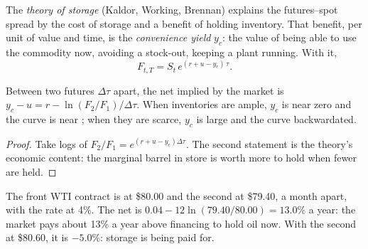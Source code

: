 \begin{definition}\label{def:m3:forward-curves-storage-and-convenience-yield:storage}
The \emph{theory of storage} (Kaldor, Working, Brennan) explains the
futures--spot spread by the cost of storage and a benefit of holding inventory. That benefit, per
unit of value and time, is the \emph{convenience yield} $y_c$: the value of
being able to use the commodity now, avoiding a stock-out, keeping a plant running. With it,
\[
F_{t,T} = S_t\,e^{(r + u - y_c)\,\tau}.
\]
\end{definition}

\begin{proposition}\label{prop:m3:forward-curves-storage-and-convenience-yield:inventory}
Between two futures $\Delta\tau$ apart, the net  implied by the market is
$y_c - u = r - \ln(F_2/F_1)/\Delta\tau$. When inventories are ample, $y_c$ is near zero and the curve
is near ; when they are scarce, $y_c$ is large and the curve backwardated.
\end{proposition}

\begin{proof}
Take logs of $F_2/F_1 = e^{(r + u - y_c)\Delta\tau}$. The second statement is the theory's economic
content: the marginal barrel in store is worth more to hold when fewer are held.
\end{proof}

\begin{example}\label{ex:m3:forward-curves-storage-and-convenience-yield:read}
The front WTI contract is at \$80.00 and the second at \$79.40, a month apart, with the rate at 4\%.
The net  is $0.04 - 12\ln(79.40/80.00) = 13.0\%$ a year: the market pays about 13\%
a year above financing to hold oil now. With the second at \$80.60, it is $-5.0\%$: storage is being
paid for.
\end{example}

